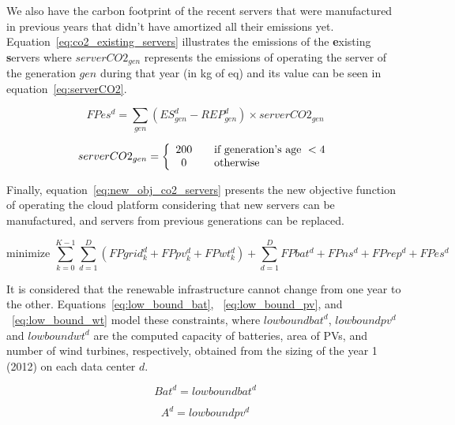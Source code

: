 We also have the carbon footprint of the recent servers that were manufactured in previous years that didn't have amortized all their emissions yet. Equation~\eqref{eq:co2_existing_servers} illustrates the emissions of the \textbf{e}xisting \textbf{s}ervers where $serverCO2_{gen}$ represents the emissions of operating the server of the generation $gen$ during that year (in kg of  eq) and its value can be seen in equation~\eqref{eq:serverCO2}.

\begin{equation} \label{eq:co2_existing_servers}
FPes^d = \sum_{gen} ( ES_{gen}^d - REP_{gen}^d )  \times serverCO2_{gen}
\end{equation}

\begin{equation} \label{eq:serverCO2}
serverCO2_{gen} =  \left\{ 
  \begin{array}{ c l }
    200   & \quad \textrm{if generation's age   } < 4 \\
    0     & \quad \textrm{otherwise  } \\
  \end{array}
\right.
\end{equation}


Finally, equation~\eqref{eq:new_obj_co2_servers} presents the new objective function of operating the cloud platform considering that new servers can be manufactured, and servers from previous generations can be replaced.

\begin{equation} \label{eq:new_obj_co2_servers}
\text{minimize }\sum_{k=0}^{K-1} \sum_{d=1}^D ( FPgrid^d_k +  FPpv^d_k +  FPwt^d_k) + \sum_{d=1}^D FPbat^d + FPns^d + FPrep^d + FPes^d 
\end{equation}

It is considered that the renewable infrastructure cannot change from one year to the other. Equations~\eqref{eq:low_bound_bat}, ~\eqref{eq:low_bound_pv}, and ~\eqref{eq:low_bound_wt} model these constraints, where $lowboundbat^d$, $lowboundpv^d$ and $lowboundwt^d$ are the computed capacity of batteries, area of PVs, and number of wind turbines, respectively, obtained from the sizing of the year 1 (2012) on each data center $d$.

\begin{equation} \label{eq:low_bound_bat}
Bat^d = lowboundbat^d
\end{equation}

\begin{equation} \label{eq:low_bound_pv}
A^d = lowboundpv^d
\end{equation}

